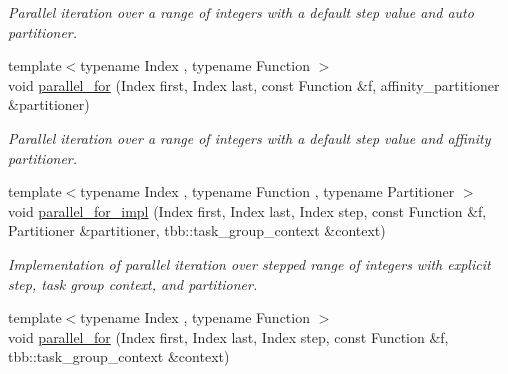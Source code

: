 \begin{DoxyCompactItemize}
\begin{DoxyCompactList}\small\item\em Parallel iteration over a range of integers with a default step value and auto partitioner. \end{DoxyCompactList}\item 
\hypertarget{namespacetbb_1_1strict__ppl_abd360af7e3f542401883cc23aeeff346}{}{\footnotesize template$<$typename Index , typename Function $>$ }\\void \hyperlink{namespacetbb_1_1strict__ppl_abd360af7e3f542401883cc23aeeff346}{parallel\+\_\+for} (Index first, Index last, const Function \&f, affinity\+\_\+partitioner \&partitioner)\label{namespacetbb_1_1strict__ppl_abd360af7e3f542401883cc23aeeff346}

\begin{DoxyCompactList}\small\item\em Parallel iteration over a range of integers with a default step value and affinity partitioner. \end{DoxyCompactList}\item 
\hypertarget{namespacetbb_1_1strict__ppl_a3f4db314e9939d993804e88caed71b3b}{}{\footnotesize template$<$typename Index , typename Function , typename Partitioner $>$ }\\void \hyperlink{namespacetbb_1_1strict__ppl_a3f4db314e9939d993804e88caed71b3b}{parallel\+\_\+for\+\_\+impl} (Index first, Index last, Index step, const Function \&f, Partitioner \&partitioner, tbb\+::task\+\_\+group\+\_\+context \&context)\label{namespacetbb_1_1strict__ppl_a3f4db314e9939d993804e88caed71b3b}

\begin{DoxyCompactList}\small\item\em Implementation of parallel iteration over stepped range of integers with explicit step, task group context, and partitioner. \end{DoxyCompactList}\item 
\hypertarget{namespacetbb_1_1strict__ppl_a763717e8643fb9e8ff3ddc3dbe3a505f}{}{\footnotesize template$<$typename Index , typename Function $>$ }\\void \hyperlink{namespacetbb_1_1strict__ppl_a763717e8643fb9e8ff3ddc3dbe3a505f}{parallel\+\_\+for} (Index first, Index last, Index step, const Function \&f, tbb\+::task\+\_\+group\+\_\+context \&context)\label{namespacetbb_1_1strict__ppl_a763717e8643fb9e8ff3ddc3dbe3a505f}


\end{DoxyCompactItemize}
